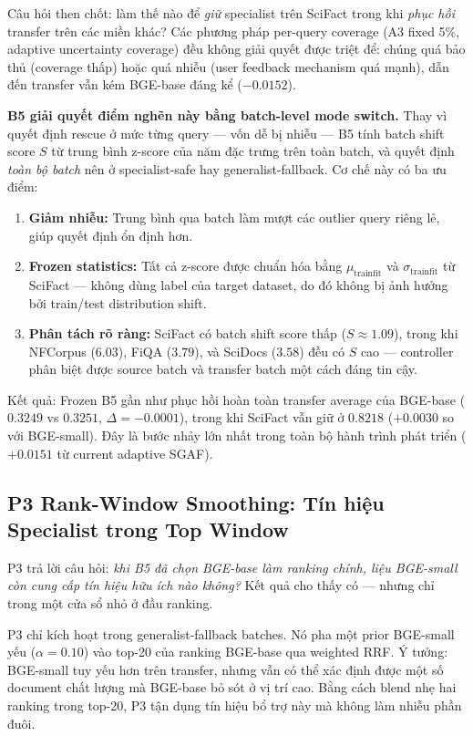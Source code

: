 Câu hỏi then chốt: làm thế nào để \emph{giữ} specialist trên SciFact trong khi \emph{phục hồi} transfer
trên các miền khác? Các phương pháp per-query coverage (A3 fixed 5\%, adaptive uncertainty coverage)
đều không giải quyết được triệt để: chúng quá bảo thủ (coverage thấp) hoặc quá nhiễu (user feedback
mechanism quá mạnh), dẫn đến transfer vẫn kém BGE-base đáng kể ($-0.0152$).

\textbf{B5 giải quyết điểm nghẽn này bằng batch-level mode switch.} Thay vì quyết định rescue ở mức
từng query --- vốn dễ bị nhiễu --- B5 tính batch shift score $S$ từ trung bình z-score của năm đặc trưng
trên toàn batch, và quyết định \emph{toàn bộ batch} nên ở specialist-safe hay generalist-fallback. Cơ
chế này có ba ưu điểm:

\begin{enumerate}[leftmargin=2em,itemsep=2pt]
  \item \textbf{Giảm nhiễu:} Trung bình qua batch làm mượt các outlier query riêng lẻ, giúp quyết định ổn
  định hơn.
  \item \textbf{Frozen statistics:} Tất cả z-score được chuẩn hóa bằng $\mu_{\text{trainfit}}$ và
  $\sigma_{\text{trainfit}}$ từ SciFact --- không dùng label của target dataset, do đó không bị ảnh
  hưởng bởi train/test distribution shift.
  \item \textbf{Phân tách rõ ràng:} SciFact có batch shift score thấp ($S \approx 1.09$), trong khi
  NFCorpus ($6.03$), FiQA ($3.79$), và SciDocs ($3.58$) đều có $S$ cao --- controller phân biệt được
  source batch và transfer batch một cách đáng tin cậy.
\end{enumerate}

Kết quả: Frozen B5 gần như phục hồi hoàn toàn transfer average của BGE-base ($0.3249$ vs $0.3251$,
$\Delta = -0.0001$), trong khi SciFact vẫn giữ ở $0.8218$ ($+0.0030$ so với BGE-small). Đây là bước nhảy
lớn nhất trong toàn bộ hành trình phát triển ($+0.0151$ từ current adaptive SGAF).

\subsection{P3 Rank-Window Smoothing: Tín hiệu Specialist trong Top Window}

P3 trả lời câu hỏi: \emph{khi B5 đã chọn BGE-base làm ranking chính, liệu BGE-small còn cung cấp tín
hiệu hữu ích nào không?} Kết quả cho thấy có --- nhưng chỉ trong một cửa sổ nhỏ ở đầu ranking.

P3 chỉ kích hoạt trong generalist-fallback batches. Nó pha một prior BGE-small yếu ($\alpha = 0.10$) vào
top-20 của ranking BGE-base qua weighted RRF. Ý tưởng: BGE-small tuy yếu hơn trên transfer, nhưng vẫn
có thể xác định được một số document chất lượng mà BGE-base bỏ sót ở vị trí cao. Bằng cách blend nhẹ
hai ranking trong top-20, P3 tận dụng tín hiệu bổ trợ này mà không làm nhiễu phần đuôi.

